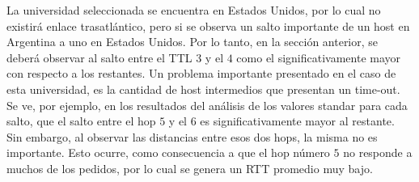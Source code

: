 La universidad seleccionada se encuentra en Estados Unidos, por lo cual no existirá enlace trasatlántico, pero si se observa un salto importante de un host en Argentina a uno en Estados Unidos. Por lo tanto, en la sección anterior, se deberá observar al salto entre el TTL $3$ y el $4$ como el significativamente mayor con respecto a los restantes. 
Un problema importante presentado en el caso de esta universidad, es la cantidad de host intermedios que presentan un time-out. Se ve, por ejemplo, en los resultados del análisis de los valores standar para cada salto, que el salto entre el hop $5$ y el $6$ es significativamente mayor al restante. Sin embargo, al observar las distancias entre esos dos hops, la misma no es importante. Esto ocurre, como consecuencia a que el hop número $5$ no responde a muchos de los pedidos, por lo cual se genera un RTT promedio muy bajo. 
